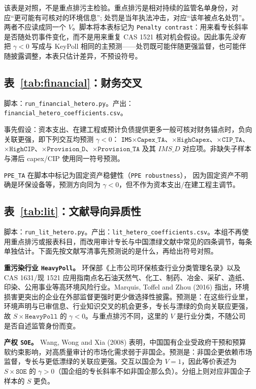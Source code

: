 \documentclass[11pt]{article}
\begin{document}
该表是对照，不是重点排污主检验。重点排污是相对持续的监管名单身份，对应``更可能有可核对的环境信息''; 处罚是当年执法冲击，对应``该年被点名处罚''。两者不应读成同一个 \(V\)。脚本将本表标记为 \texttt{Penalty contrast}：用来看专长斜率是否随处罚事件变化，而不是用来重复 CAS 1521 核对机会假设。因此事先\emph{没有}把 \(\gamma<0\) 写成与 KeyPoll 相同的主预测——处罚既可能伴随更强监督，也可能伴随披露调整，本表只估计差异，不预设符号。

\subsection{表~\ref{tab:financial}：财务交叉}

脚本：\texttt{run\_financial\_hetero.py}。产出：\texttt{financial\_hetero\_coefficients.csv}。

事先假设：资本支出、在建工程或预计负债提供更多一般可核对财务锚点时，负向关联更强，即下列交互均预测 \(\gamma<0\)：
\texttt{IMS}\(\times\texttt{Capex\_TA}\)、\(\times\texttt{HighCapex}\)、\(\times\texttt{CIP\_TA}\)、\(\times\texttt{HighCIP}\)、\(\times\texttt{Provision\_D}\)、\(\times\texttt{Provision\_TA}\)
及其 \(IMS\_D\) 对应项。非缺失子样本与滞后 capex/CIP 使用同一符号预测。

\texttt{PPE\_TA} 在脚本中标记为固定资产稳健性（\texttt{PPE robustness}）， 因为固定资产不明确是环保设备等，预测方向同为 \(\gamma<0\)，但不作为资本支出/在建工程主调节。

\subsection{表~\ref{tab:lit}：文献导向异质性}

脚本：\texttt{run\_lit\_hetero.py}。产出：\texttt{lit\_hetero\_coefficients.csv}。本组不再使用重点排污或报表科目，而改用审计专长与中国漂绿文献中常见的四条调节，每条单独估计。下面先按文献写清事先预测说的是什么，再给出符号对照。

\textbf{重污染行业 \texttt{HeavyPoll}。}
环保部《上市公司环保核查行业分类管理名录》以及 CAS 1631/现 1521 应用指南点名石油天然气、化工、制药、冶金、采矿、造纸、印染、公用事业等高环境风险行业。Marquis, Toffel and Zhou (2016) 指出，环境损害更突出的企业在外部监督更强时更少做选择性披露。预测是：在这些行业里，环境声明与已审信息、行业知识交叉的机会更多，专长与漂绿的负向关联应更强，故 \(S\times\texttt{HeavyPoll}\) 的 \(\gamma<0\)。与重点排污不同，这里的 \(V\) 是行业分类，不随公司是否自述监管身份而变。

\textbf{产权 \texttt{SOE}。}
Wang, Wong and Xia (2008) 表明，中国国有企业受政府干预和预算软约束影响，对高质量审计的市场化需求弱于非国企。预测是：非国企更依赖市场监督，专长与更低漂绿的关联应更强。交互以国企为 \(V=1\)，因此等价表述为 \(S\times\texttt{SOE}\) 的 \(\gamma>0\)（国企组的专长斜率不如非国企那么负）。分组上则对应非国企子样本的 \(S\) 更负。
\end{document}
